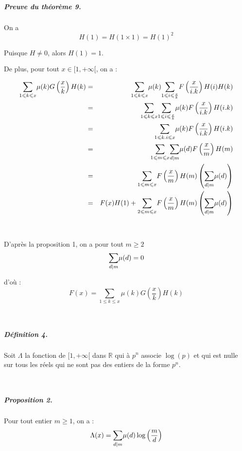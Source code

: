 \subparagraph{Preuve du th{\'e}or{\`e}me 9.}

On a
\[ H (1) = H (1 \times 1) = H (1)^2 \]

Puisque $H \neq 0$, alors $H (1) = 1$.

De plus, pour tout $x \in [1, + \infty [$, on a :

\begin{eqnarray*}
  \underset{1 \leqslant k \leqslant x}{\sum} \mu (k) G \left( \frac{x}{k}
  \right) H (k) & = & \underset{1 \leqslant k \leqslant x}{\sum} \mu (k)
  \underset{1 \leqslant i \leqslant \frac{x}{k}}{\sum} F \left( \frac{x}{i.k}
  \right) H (i) H (k)\\
  & = & \underset{1 \leqslant k \leqslant x}{\sum} \underset{1 \leqslant i
  \leqslant \frac{x}{k}}{\sum} \mu (k) F \left( \frac{x}{i.k} \right) H
  (i.k)\\
  & = & \underset{1 \leqslant k.i \leqslant x}{\sum} \mu (k) F \left(
  \frac{x}{i.k} \right) H (i.k)\\
  & = & \underset{1 \leqslant m \leqslant x}{\sum}  \underset{d | 
  m}{\sum} \mu (d) F \left( \frac{x}{m} \right) H (m)\\
  & = & \underset{1 \leqslant m \leqslant x}{\sum} F \left( \frac{x}{m}
  \right) H (m) \left( \underset{d |  m}{\sum} \mu (d) \right)\\
  & = & F (x) H (1) + \underset{2 \leqslant m \leqslant x}{\sum} F \left(
  \frac{x}{m} \right) H (m) \left( \underset{d |  m}{\sum} \mu (d)
  \right)
\end{eqnarray*}


\

D'apr{\`e}s la proposition 1, on a pour tout $m \geqslant 2$
\[ \underset{d |  m}{\sum} \mu (d) = 0 \]


d'o{\`u} :
\[ F (x) = \underset{1 \leqslant k \leqslant x}{\sum} \mu (k) G \left(
   \frac{x}{k} \right) H (k) \]


\

\subparagraph{D{\'e}finition 4.}

Soit $\Lambda$ la fonction de $[1, + \infty [$ dans $\mathbb{R}$ qui {\`a}
$p^n$ associe $\log (p)$ et qui est nulle sur tous les r{\'e}els qui ne sont
pas des entiers de la forme $p^n$.

\

\subparagraph{Proposition 2.}

Pour tout entier $m \geqslant 1$, on a :
\[ \Lambda (x) = \underset{d |  m}{\sum} \mu (d) \log \left(
   \frac{m}{d} \right) \]


